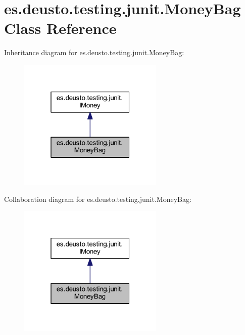 \hypertarget{classes_1_1deusto_1_1testing_1_1junit_1_1_money_bag}{}\section{es.\+deusto.\+testing.\+junit.\+Money\+Bag Class Reference}
\label{classes_1_1deusto_1_1testing_1_1junit_1_1_money_bag}


Inheritance diagram for es.\+deusto.\+testing.\+junit.\+Money\+Bag\+:\nopagebreak
\begin{figure}[H]
\begin{center}
\leavevmode
\includegraphics[width=196pt]{classes_1_1deusto_1_1testing_1_1junit_1_1_money_bag__inherit__graph}
\end{center}
\end{figure}


Collaboration diagram for es.\+deusto.\+testing.\+junit.\+Money\+Bag\+:\nopagebreak
\begin{figure}[H]
\begin{center}
\leavevmode
\includegraphics[width=196pt]{classes_1_1deusto_1_1testing_1_1junit_1_1_money_bag__coll__graph}
\end{center}
\end{figure}
